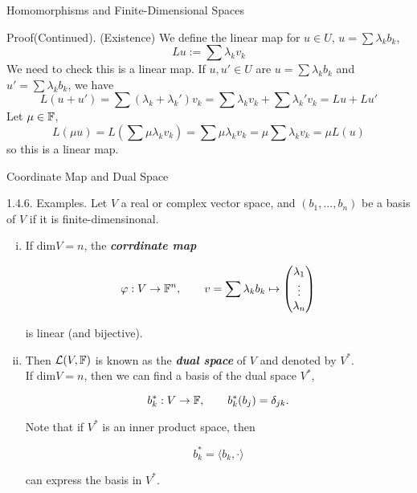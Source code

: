\documentclass[hyperref={pdfpagelabels=true}]{beamer}
\newcommand{\highlightg}[1]{\textcolor[rgb]{0.1,0.5,0.3}{\emph{\textbf{#1}}}}
\newcommand{\structb}[1]{\textcolor[rgb]{0.2,0.2,0.7}{#1}}
\newcommand{\<}{\langle}
\renewcommand{\>}{\rangle}
\begin{document}
\begin{frame}{Homomorphisms and Finite-Dimensional Spaces}
    \begin{block}{Proof(Continued).}
        \structb{(Existence)} We define the linear map for $u \in U$, $u = \sum \lambda_{k}b_{k}$,
        \[Lu:=\sum \lambda_{k}v_{k}\]
        We need to check this is a linear map. If $u,u' \in U$ are $u = \sum \lambda_{k}b_{k}$ and $u' = \sum \lambda_{k}b_{k}$, we have
        \[L(u+u') = \sum (\lambda_{k}+\lambda_{k}')v_{k} = \sum \lambda_{k}v_{k}+ \sum \lambda_{k}'v_{k} = Lu+Lu'\]
        Let $\mu \in \mathbb{F}$,
        \[L(\mu u) = L(\sum \mu \lambda_{k}v_{k}) = \sum \mu \lambda_{k}v_{k} = \mu \sum \lambda_{k}v_{k} = \mu L(u)\]
        so this is a linear map.
    \end{block}
\end{frame}
\begin{frame}{Coordinate Map and Dual Space}
    \begin{block}{}
        \structb{1.4.6. Examples.} Let $V$ a real or complex vector space, and $(b_{1},...,b_{n})$ be a basis of $V$ if it is finite-dimensinonal.
        \begin{enumerate}[(i)]
            \item If $\text{dim}V = n$, the \highlightg{corrdinate map}
            \begin{spacing}{0.6}
            \[
                \varphi:V \rightarrow \mathbb{F}^{n}, \qquad v = \sum \lambda_{k}b_{k} \mapsto 
                \begin{pmatrix}
                    \lambda_{1}\\
                    \vdots\\
                    \lambda_{n}\\
                \end{pmatrix}
            \]
            \end{spacing}
            is linear (and bijective).
            \item Then $\mathcal{L}(V,\mathbb{F})$ is known as the \highlightg{dual space} of $V$ and denoted by $V^{*}$. \\
            If $\text{dim}V = n$, then we can find a basis of the dual space $V^{*}$,
            \begin{spacing}{0.8}
            \[
                b_{k}^{*}:V \rightarrow \mathbb{F},
                \qquad
                b_{k}^{*}(b_{j}) = \delta_{jk}.
            \]
            \end{spacing}
            Note that if $V^{*}$ is an inner product space, then 
            \begin{spacing}{0.7}
            \[b_{k}^{*} = \<b_{k},\cdot\>\]
            \end{spacing}
            can express the basis in $V^{*}$. 
        \end{enumerate}
    \end{block}
\end{frame}
\end{document}
